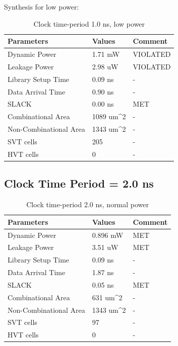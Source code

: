\documentclass[11pt,a4paper]{article}
\begin{document}
Synthesis for low power:

\begin{table}[htbp]
\begin{center}
\begin{tabular}{|l|l|l|}
\hline
\textbf{Parameters}	& \textbf{Values}		& \textbf{Comment}\\ \hline
Dynamic Power				&	1.71 mW				& VIOLATED\\ \hline
Leakage Power 			&	2.98 uW				& VIOLATED\\ \hline
Library Setup Time  & 0.09 ns				& - \\ \hline
Data Arrival Time		& 0.90 ns				& - \\ \hline
SLACK								& 0.00 ns				& MET\\ \hline
Combinational Area	& 1089 um^2			& - \\ \hline
Non-Combinational Area	& 1343 um^2	& - \\ \hline
SVT cells						& 205						& - \\ \hline
HVT cells						& 0							& - \\ \hline
\end{tabular}
\end{center}
\caption{Clock time-period 1.0 ns, low power}
\label{tab:syn1.0.2}
\end{table}

\newpage
\subsection{Clock Time Period = 2.0 ns}
\begin{table}[htbp]
\begin{center}
\begin{tabular}{|l|l|l|}
\hline
\textbf{Parameters}	& \textbf{Values}		& \textbf{Comment}\\ \hline
Dynamic Power				&	0.896 mW			& MET\\ \hline
Leakage Power 			&	3.51 uW				& MET \\ \hline
Library Setup Time  & 0.09 ns				& - \\ \hline
Data Arrival Time		& 1.87 ns				& - \\ \hline
SLACK								& 0.05 ns				& MET \\ \hline
Combinational Area	& 631 um^2			& - \\ \hline
Non-Combinational Area	& 1343 um^2	& - \\ \hline
SVT cells						& 97						& - \\ \hline
HVT cells						& 0							& - \\ \hline
\end{tabular}
\end{center}
\caption{Clock time-period 2.0 ns, normal power}
\label{tab:syn2.0.1}
\end{table}
\end{document}
